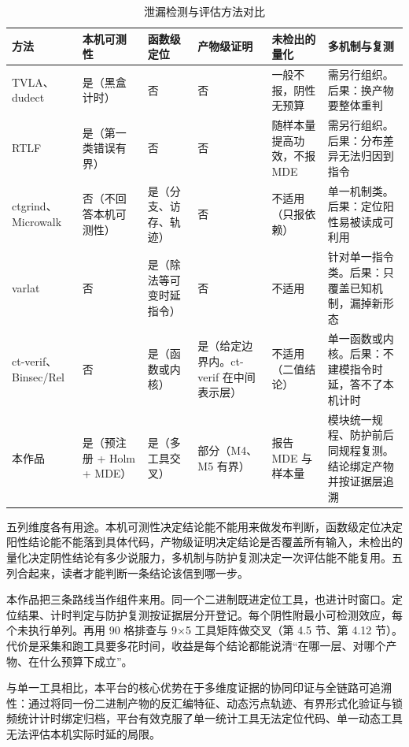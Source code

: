 \begin{table}[H]
\centering
\caption{泄漏检测与评估方法对比}
\label{tab:compare}
{\footnotesize
\begin{tabularx}{\textwidth}{|>{\raggedright\arraybackslash}p{2.7cm}|>{\raggedright\arraybackslash}p{2.3cm}|>{\raggedright\arraybackslash}p{2.3cm}|>{\raggedright\arraybackslash}p{2.5cm}|>{\raggedright\arraybackslash}p{2.3cm}|>{\raggedright\arraybackslash}X|}
\hline
方法 & 本机可测性 & 函数级定位 & 产物级证明 & 未检出的量化 & 多机制与复测 \\
\hline
TVLA\cite{tvla}、dudect\cite{dudect} & 是（黑盒计时） & 否 & 否 & 一般不报，阴性无预算 & 需另行组织。后果：换产物要整体重判 \\
\hline
RTLF\cite{rtlf} & 是（第一类错误有界） & 否 & 否 & 随样本量提高功效，不报 MDE & 需另行组织。后果：分布差异无法归因到指令 \\
\hline
ctgrind\cite{ctgrind}、Microwalk\cite{microwalk} & 否（不回答本机可测性） & 是（分支、访存、轨迹） & 否 & 不适用（只报依赖） & 单一机制类。后果：定位阳性易被读成可利用 \\
\hline
varlat\cite{kyberslash} & 否 & 是（除法等可变时延指令） & 否 & 不适用 & 针对单一指令类。后果：只覆盖已知机制，漏掉新形态 \\
\hline
ct-verif\cite{ctverif}、Binsec/Rel\cite{binsec} & 否 & 是（函数或内核） & 是（给定边界内。ct-verif 在中间表示层） & 不适用（二值结论） & 单一函数或内核。后果：不建模指令时延，答不了本机计时 \\
\hline
本作品 & 是（预注册 + Holm + MDE） & 是（多工具交叉） & 部分（M4、M5 有界） & 报告 MDE 与样本量 & 5 模块统一规程、防护前后同规程复测。结论绑定产物并按证据层追溯 \\
\hline
\end{tabularx}
}
\end{table}

五列维度各有用途。本机可测性决定结论能不能用来做发布判断，函数级定位决定阳性结论能不能落到具体代码，产物级证明决定结论是否覆盖所有输入，未检出的量化决定阴性结论有多少说服力，多机制与防护复测决定一次评估能不能复用。五列合起来，读者才能判断一条结论该信到哪一步。

本作品把三条路线当作组件来用。同一个二进制既进定位工具，也进计时窗口。定位结果、计时判定与防护复测按证据层分开登记。每个阴性附最小可检测效应，每个未执行单列。再用 90 格排查与 9×5 工具矩阵做交叉（第 4.5 节、第 4.12 节）。代价是采集和跑工具要多花时间，收益是每个结论都能说清“在哪一层、对哪个产物、在什么预算下成立”。

与单一工具相比，本平台的核心优势在于多维度证据的协同印证与全链路可追溯性：通过将同一份二进制产物的反汇编特征、动态污点轨迹、有界形式化验证与锁频统计计时绑定归档，平台有效克服了单一统计工具无法定位代码、单一动态工具无法评估本机实际时延的局限。

